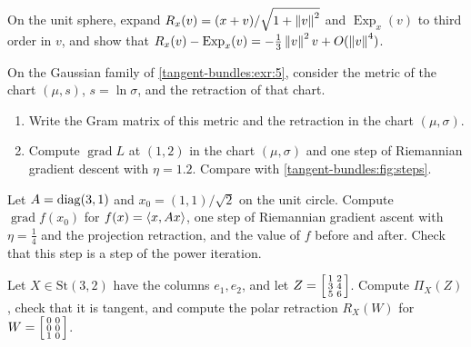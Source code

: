 \begin{notechapter}
\begin{exercise}\label{riemannian-optimization:exr:3}
On the unit sphere, expand $R_x(v) = (x + v)/\sqrt{1 + \left\|v\right\|^2}$ and
$\operatorname{Exp}_x(v)$ to third order in $v$, and show that
$R_x(v) - \operatorname{Exp}_x(v) = -\frac13\left\|v\right\|^2v + O(\left\|v\right\|^4)$.
\end{exercise}

\begin{exercise}\label{riemannian-optimization:exr:4}
On the Gaussian family of \cref{tangent-bundles:exr:5}, consider the
metric of the chart $(\mu, s)$, $s = \ln\sigma$, and the retraction of
that chart.
\begin{enumerate}[nosep]
  \item Write the Gram matrix of this metric and the retraction in the
        chart $(\mu, \sigma)$.
  \item Compute $\operatorname{grad}L$ at $(1, 2)$ in the chart
        $(\mu, \sigma)$ and one step of Riemannian gradient descent with
        $\eta = 1.2$. Compare with \cref{tangent-bundles:fig:steps}.
\end{enumerate}
\end{exercise}

\begin{exercise}\label{riemannian-optimization:exr:5}
Let $A = \operatorname{diag}(3, 1)$ and $x_0 = (1, 1)/\sqrt2$ on the unit circle.
Compute $\operatorname{grad}f(x_0)$ for $f(x) = \left\langle x, Ax \right\rangle$, one step
of Riemannian gradient ascent with $\eta = \frac14$ and the projection
retraction, and the value of $f$ before and after. Check that this step
is a step of the power iteration.
\end{exercise}

\begin{exercise}\label{riemannian-optimization:exr:6}
Let $X\in\mathrm{St}(3, 2)$ have the columns $e_1, e_2$, and let
$Z = \begin{bsmallmatrix}1 & 2\\ 3 & 4\\ 5 & 6\end{bsmallmatrix}$.
Compute $\Pi_X(Z)$, check that it is tangent, and compute the polar
retraction $R_X(W)$ for
$W = \begin{bsmallmatrix}0 & 0\\ 0 & 0\\ 1 & 0\end{bsmallmatrix}$.
\end{exercise}


\end{notechapter}
